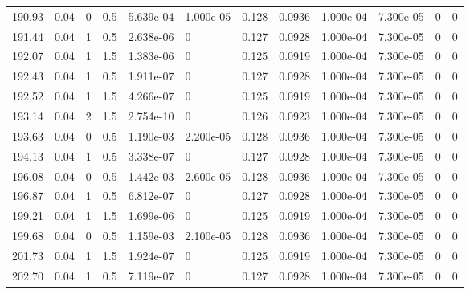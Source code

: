 \documentclass[preview]{standalone}
\begin{document}
{{{{{{\begin{tabular}{L{1.2cm}C{1.2cm} C{0.3cm}C{0.5cm} C{1.4cm}C{1.4cm} C{1.4cm}C{1.4cm} C{1.6cm}C{1.6cm} C{1.6cm}C{1.6cm}}
  190.93  &  0.04  & 0     & 0.5 &  5.639e-04  & 1.000e-05  &  0.128&   0.0936& 1.000e-04 & 7.300e-05   &  0 & 0  \\ 
  191.44  &  0.04  & 1     & 0.5 &  2.638e-06  & 0  &  0.127&   0.0928& 1.000e-04 & 7.300e-05   &  0 & 0  \\ 
  192.07  &  0.04  & 1     & 1.5 &  1.383e-06  & 0  &  0.125&   0.0919& 1.000e-04 & 7.300e-05   &  0 & 0  \\ 
  192.43  &  0.04  & 1     & 0.5 &  1.911e-07  & 0  &  0.127&   0.0928& 1.000e-04 & 7.300e-05   &  0 & 0  \\ 
  192.52  &  0.04  & 1     & 1.5 &  4.266e-07  & 0  &  0.125&   0.0919& 1.000e-04 & 7.300e-05   &  0 & 0  \\ 
  193.14  &  0.04  & 2     & 1.5 &  2.754e-10  & 0  &  0.126&   0.0923& 1.000e-04 & 7.300e-05   &  0 & 0  \\ 
  193.63  &  0.04  & 0     & 0.5 &  1.190e-03  & 2.200e-05  &  0.128&   0.0936& 1.000e-04 & 7.300e-05   &  0 & 0  \\ 
  194.13  &  0.04  & 1     & 0.5 &  3.338e-07  & 0  &  0.127&   0.0928& 1.000e-04 & 7.300e-05   &  0 & 0  \\ 
  196.08  &  0.04  & 0     & 0.5 &  1.442e-03  & 2.600e-05  &  0.128&   0.0936& 1.000e-04 & 7.300e-05   &  0 & 0  \\ 
  196.87  &  0.04  & 1     & 0.5 &  6.812e-07  & 0  &  0.127&   0.0928& 1.000e-04 & 7.300e-05   &  0 & 0  \\ 
  199.21  &  0.04  & 1     & 1.5 &  1.699e-06  & 0  &  0.125&   0.0919& 1.000e-04 & 7.300e-05   &  0 & 0  \\ 
  199.68  &  0.04  & 0     & 0.5 &  1.159e-03  & 2.100e-05  &  0.128&   0.0936& 1.000e-04 & 7.300e-05   &  0 & 0  \\ 
  201.73  &  0.04  & 1     & 1.5 &  1.924e-07  & 0  &  0.125&   0.0919& 1.000e-04 & 7.300e-05   &  0 & 0  \\ 
  202.70  &  0.04  & 1     & 0.5 &  7.119e-07  & 0  &  0.127&   0.0928& 1.000e-04 & 7.300e-05   &  0 & 0  \\ 
\hline 
\end{tabular} 

}}}}}}
\end{document}
